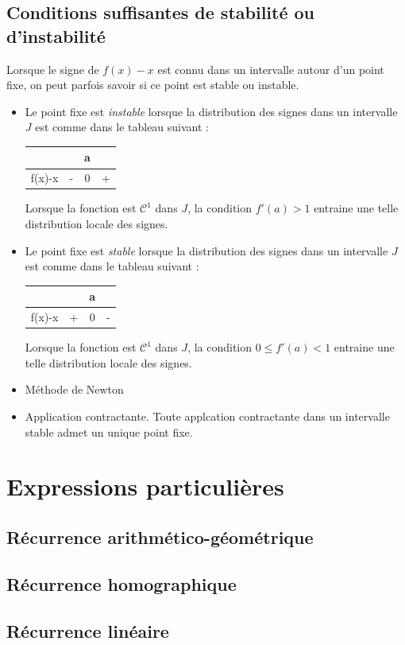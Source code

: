 \subsection{Conditions suffisantes de stabilité ou d'instabilité}
Lorsque le signe de $f(x)-x$ est connu dans un intervalle autour d'un point fixe, on peut parfois savoir si ce point est stable ou instable.
\begin{itemize}
 \item Le point fixe est \emph{instable} lorsque la distribution des signes dans un intervalle $J$ est comme dans le tableau suivant :
\begin{center}
 \begin{tabular}{c|ccc|}
   &  & a &  \\  \hline
 f(x)-x   & - & 0 & + \\ \hline
\end{tabular}
\end{center}
Lorsque la fonction est $\mathcal C^1$ dans $J$, la condition $f'(a)>1$ entraine une telle distribution locale des signes.

 \item Le point fixe est \emph{stable} lorsque la distribution des signes dans un intervalle $J$ est comme dans le tableau suivant :
\begin{center}
 \begin{tabular}{c|ccc|}
   &  & a &  \\  \hline
 f(x)-x   & + & 0 & - \\ \hline
\end{tabular}
\end{center}
Lorsque la fonction est $\mathcal C^1$ dans $J$, la condition $0\leq f'(a) < 1$ entraine une telle distribution locale des signes.
\end{itemize}
\begin{rems}
 \begin{itemize}
  \item Méthode de Newton
  \item Application contractante. Toute applcation contractante dans un intervalle stable admet un unique point fixe.
 \end{itemize}

\end{rems}

\section{Expressions particulières}
\subsection{Récurrence arithmético-géométrique}
\subsection{Récurrence homographique}
\subsection{Récurrence linéaire}

